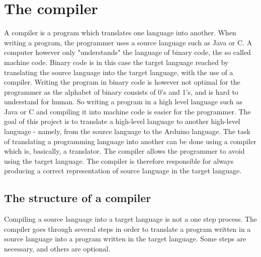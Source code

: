 \chapter{The compiler} \label{chap:the_compiler}
A compiler is a program which translates one language into another. When writing a program, the programmer uses a source language such as Java or C. A computer however only "understands" the language of binary code, the so called machine code. Binary code is in this case the target language reached by translating the source language into the target language, with the use of a compiler. Writing the program in binary code is however not optimal for the programmer as the alphabet of binary consists of 0's and 1's, and is hard to understand for human. So writing a program in a high level language such as Java or C and compiling it into machine code is easier for the programmer.
The goal of this project is to translate a high-level language to another high-level language - namely, from the source language to the Arduino language. The task of translating a programming language into another can be done using a compiler which is, basically, a translator. The compiler allows the programmer to avoid using the target language. The compiler is therefore responsible for always producing a correct representation of source language in the target language.

\section{The structure of a compiler} 
\label{sec:compiler}
Compiling a source language into a target language is not a one step process. The compiler goes through several steps in order to translate a program written in a source language into a program written in the target language. Some steps are necessary, and others are optional.

